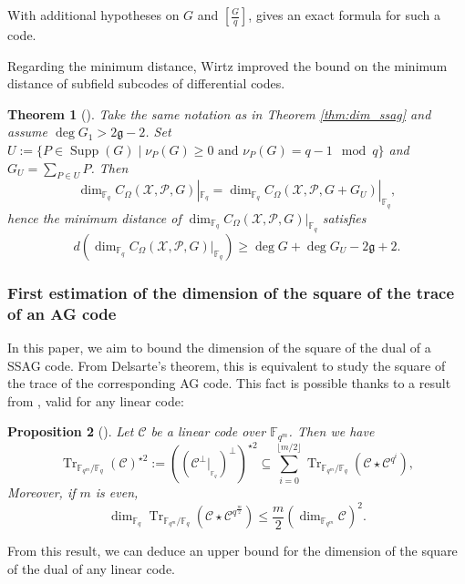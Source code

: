 \documentclass[a4paper]{amsart}
\newtheorem{thm}{Theorem}[section]
\newtheorem{proposition}[thm]{Proposition}
\theoremstyle{definition}
\theoremstyle{remark}
\newcommand{\calP}{\mathcal{P}}
\newcommand{\calC}{\mathcal{C}}
\newcommand{\calX}{\mathcal{X}}
\newcommand{\fqm}{\mathbb{F}_{q^m}}
\newcommand{\fq}{\mathbb{F}_{q}}
\newcommand{\Tr}[1]{\operatorname{Tr}_{\mathbb{F}_{q^m}/\fq}\left(#1\right)}
\newcommand{\Supp}{\operatorname{Supp}}
\begin{document}
With additional hypotheses on $G$ and $\displaystyle \left[ \frac{G}{q} \right]$, {\cite[Theorem~1]{Le16}} gives an exact formula for such a code.

Regarding the minimum distance, Wirtz \cite{W88} improved the bound on the minimum distance of subfield subcodes of differential codes.

\begin{thm}[{\cite[Theorem~2]{W88}}]\label{thm:Wirtz}
	Take the same notation as in Theorem \ref{thm:dim_ssag} and assume $\deg G_1 > 2 \mathfrak{g}-2$.
	Set $U:=\{P \in \Supp(G) \mid \nu_P(G) \geq 0 \text{ and } \nu_P(G) = q-1 \mod q\}$ and $G_U=\sum_{P \in U} P$. Then
	\[	\dim_{\fq} C_{\Omega}(\calX,\calP,G)|_{\fq} = 	\dim_{\fq} C_{\Omega}(\calX,\calP,G+G_U)|_{\fq}, \]
	hence the minimum distance of $\dim_{\fq} C_{\Omega}(\calX,\calP,G)|_{\fq}$ satisfies
	\[d\left(	\dim_{\fq} C_{\Omega}(\calX,\calP,G)|_{\fq} \right) \geq \deg G + \deg G_U -2\mathfrak{g}+2.\]
\end{thm}


\subsubsection{First estimation of the dimension of the square of the trace of an AG code}

In this paper, we aim to bound the dimension of the square of the dual of a SSAG code. From Delsarte's theorem, this is equivalent to study the square of the trace of the corresponding AG code. 
This fact is possible thanks to a result from \cite{MT21}, valid for any linear code:

\begin{proposition}[{\cite[Proposition~15]{MT21}}] \label{prop:Tr_BoundSchurSquare}
 Let $\calC$ be a linear code over $\fqm$. Then we have 
 \begin{equation} \label{eq:key_equation} \Tr{\calC}^{\star2} := ((\calC^{\perp}|_{_{{\mathbb{F}_q}}})^{\perp})^{\star2} \subseteq \sum\limits_{i=0}^{\lfloor{m/2} \rfloor} \Tr{\calC\star \calC^{q^i}},
 \end{equation}
Moreover, if $m$ is even, 
 \begin{equation} \label{eq:dim_m/2} \dim_{\fq} \Tr{\calC\star \calC^{q^{\frac{m}{2}}}} \leq \frac{m}{2} (\dim_{\fqm}\calC)^2.
\end{equation}
\end{proposition}
From this result, we can deduce an upper bound for the dimension of the square of the dual of any linear code.
\end{document}
